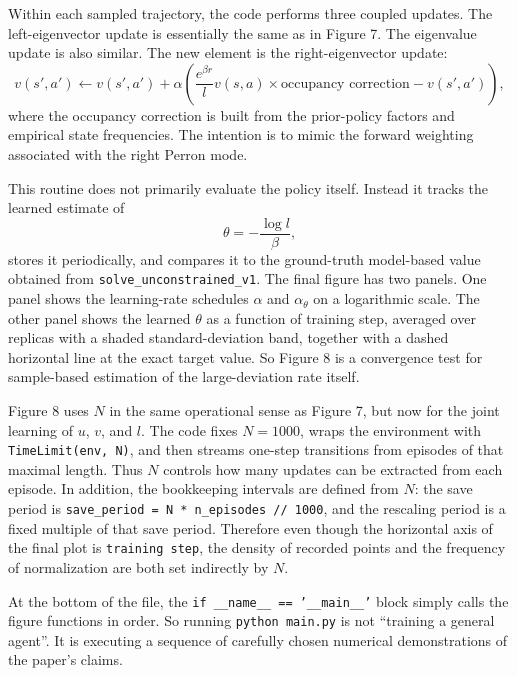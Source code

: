 \documentclass[11pt]{article}
\begin{document}
Within each sampled trajectory, the code performs three coupled updates. The left-eigenvector
update is essentially the same as in Figure 7. The eigenvalue update is also similar. The new
element is the right-eigenvector update:
\begin{equation}
    v(s',a')
    \leftarrow
    v(s',a') + \alpha\left(
        \frac{e^{\beta r}}{l}v(s,a)\times \text{occupancy correction}
        - v(s',a')
    \right),
\end{equation}
where the occupancy correction is built from the prior-policy factors and empirical state
frequencies. The intention is to mimic the forward weighting associated with the right Perron
mode.

This routine does not primarily evaluate the policy itself. Instead it tracks the learned
estimate of
\begin{equation}
    \theta = -\frac{\log l}{\beta},
\end{equation}
stores it periodically, and compares it to the ground-truth model-based value obtained from
\texttt{solve\_unconstrained\_v1}. The final figure has two panels. One panel shows the
learning-rate schedules \(\alpha\) and \(\alpha_\theta\) on a logarithmic scale. The other
panel shows the learned \(\theta\) as a function of training step, averaged over replicas with
a shaded standard-deviation band, together with a dashed horizontal line at the exact target
value. So Figure 8 is a convergence test for sample-based estimation of the large-deviation
rate itself.

Figure 8 uses \(N\) in the same operational sense as Figure 7, but now for the joint learning
of \(u\), \(v\), and \(l\). The code fixes \(N=1000\), wraps the environment with
\texttt{TimeLimit(env, N)}, and then streams one-step transitions from episodes of that maximal
length. Thus \(N\) controls how many updates can be extracted from each episode. In addition,
the bookkeeping intervals are defined from \(N\): the save period is
\texttt{save\_period = N * n\_episodes // 1000}, and the rescaling period is a fixed multiple
of that save period. Therefore even though the horizontal axis of the final plot is
\texttt{training step}, the density of recorded points and the frequency of normalization are
both set indirectly by \(N\).

At the bottom of the file, the \texttt{if \_\_name\_\_ == '\_\_main\_\_'} block simply calls
the figure functions in order. So running \texttt{python main.py} is not ``training a
general agent''. It is executing a sequence of carefully chosen numerical demonstrations of
the paper's claims.
\end{document}
